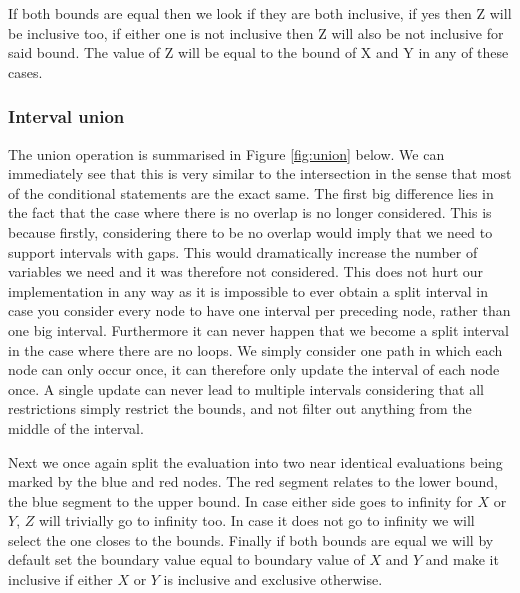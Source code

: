\documentclass[12pt]{article}
\begin{document}
If both bounds are equal then we look if they are both inclusive, if yes then Z will be inclusive too, if either one is not inclusive then Z will also be not inclusive for said bound. The value of Z will be equal to the bound of X and Y in any of these cases.

\subsubsection{Interval union}
The union operation is summarised in Figure \ref{fig:union} below. We can immediately see that this is very similar to the intersection in the sense that most of the conditional statements are the exact same. The first big difference lies in the fact that the case where there is no overlap is no longer considered. This is because firstly, considering there to be no overlap would imply that we need to support intervals with gaps. This would dramatically increase the number of variables we need and it was therefore not considered. This does not hurt our implementation in any way as it is impossible to ever obtain a split interval in case you consider every node to have one interval per preceding node, rather than one big interval. Furthermore it can never happen that we become a split interval in the case where there are no loops. We simply consider one path in which each node can only occur once, it can therefore only update the interval of each node once. A single update can never lead to multiple intervals considering that all restrictions simply restrict the bounds, and not filter out anything from the middle of the interval.

Next we once again split the evaluation into two near identical evaluations being marked by the blue and red nodes. The red segment relates to the lower bound, the blue segment to the upper bound. In case either side goes to infinity for $X$ or $Y$, $Z$ will trivially go to infinity too. In case it does not go to infinity we will select the one closes to the bounds. Finally if both bounds are equal we will by default set the boundary value equal to boundary value of $X$ and $Y$ and make it inclusive if either $X$ or $Y$ is inclusive and exclusive otherwise.
\end{document}
